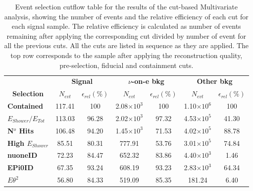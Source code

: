 \begin{table}[!hb]
\centering
\caption[Multivariate analysis cutflow table]{Event selection cutflow table for the results of the cut-based Multivariate analysis, showing the number of events and the relative efficiency of each cut for each signal sample. The relative efficiency is calculated as number of events remaining after applying the corresponding cut divided by number of event for all the previous cuts. All the cuts are listed in sequence as they are applied. The top row corresponds to the sample after applying the reconstruction quality, pre-selection, fiducial and containment cuts.}
\begin{tabular}{|l|cc|cc|cc|}\hline
\multicolumn{1}{|c|}{} & \multicolumn{2}{c|}{\textbf{Signal}} & \multicolumn{2}{c|}{\textbf{$\nu$-on-e bkg}} & \multicolumn{2}{c|}{\textbf{Other bkg}} \\
\multicolumn{1}{|c|}{\multirow{-2}{*}{\textbf{Selection}}} & \textbf{$N_{evt}$} & \textbf{$\epsilon_{rel}\left(\%\right)$} & \textbf{$N_{evt}$} & \textbf{$\epsilon_{rel}\left(\%\right)$}  & \textbf{$N_{evt}$} & \textbf{$\epsilon_{rel}\left(\%\right)$}\\\hline
\textbf{Contained} & 117.41 & 100 & 2.08$\times 10^3$ & 100 & 1.10$\times 10^6$ & 100\\
\textbf{$E_{Shower}/E_{Tot}$} & 113.03 & 96.28 & 2.02$\times 10^3$ & 97.32 & 4.53$\times 10^5$ & 41.30\\
\textbf{N$^o$ Hits} & 106.48 & 94.20 & 1.45$\times 10^3$ & 71.53 & 4.02$\times 10^5$ & 88.78\\
\textbf{High $E_{Shower}$} & 85.51 & 80.31 & 777.91 & 53.76 & 3.01$\times 10^5$ & 74.84\\
\textbf{\acrshort{nuoneID}} & 72.23 & 84.47 & 652.32 & 83.86 & 4.40$\times 10^3$ & 1.46\\
\textbf{\acrshort{EPi0ID}} & 67.35 & 93.24 & 608.19 & 93.23 & 2.83$\times 10^3$ & 64.34\\
\textbf{$E\theta^2$} & 56.80 & 84.33 & 519.09 & 85.35 & 181.24 & 6.40\\\hline
\end{tabular}
\label{tab:CutflowTableTMVA}
\end{table}

